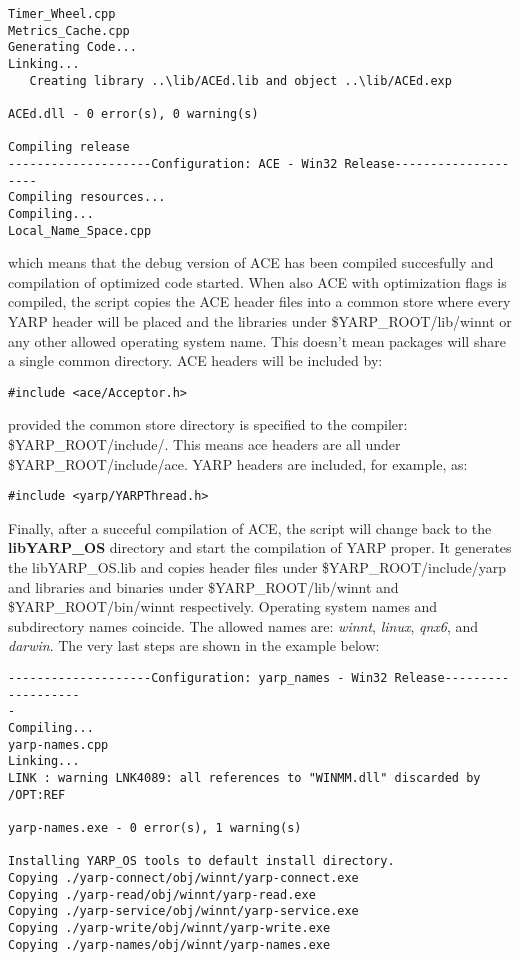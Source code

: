 \begin{verbatim}
Timer_Wheel.cpp
Metrics_Cache.cpp
Generating Code...
Linking...
   Creating library ..\lib/ACEd.lib and object ..\lib/ACEd.exp

ACEd.dll - 0 error(s), 0 warning(s)

Compiling release
--------------------Configuration: ACE - Win32 Release--------------------
Compiling resources...
Compiling...
Local_Name_Space.cpp

\end{verbatim}

which means that the debug version of ACE has been compiled succesfully and compilation of optimized code started. When also ACE with optimization flags is compiled, the script copies the ACE header files into a common store where every YARP header will be placed and the libraries under \$YARP\_ROOT/lib/winnt or any other allowed operating system name. This doesn't mean packages will share a single common directory. ACE headers will be included by:

\begin{verbatim}
#include <ace/Acceptor.h>
\end{verbatim}

provided the common store directory is specified to the compiler: \$YARP\_ROOT/include/. This means ace headers are all under \$YARP\_ROOT/include/ace. YARP headers are included, for example, as:

\begin{verbatim}
#include <yarp/YARPThread.h>
\end{verbatim}

Finally, after a succeful compilation of ACE, the script will change back to the {\bf libYARP\_OS} directory and start the compilation of YARP proper. It generates the libYARP\_OS.lib and copies header files under \$YARP\_ROOT/include/yarp and libraries and binaries under \$YARP\_ROOT/lib/winnt and \$YARP\_ROOT/bin/winnt respectively. Operating system names and subdirectory names coincide. The allowed names are: {\em winnt}, {\em linux}, {\em qnx6}, and {\em darwin}. The very last steps are shown in the example below:

\begin{verbatim}
--------------------Configuration: yarp_names - Win32 Release-------------------
-
Compiling...
yarp-names.cpp
Linking...
LINK : warning LNK4089: all references to "WINMM.dll" discarded by /OPT:REF

yarp-names.exe - 0 error(s), 1 warning(s)

Installing YARP_OS tools to default install directory.
Copying ./yarp-connect/obj/winnt/yarp-connect.exe
Copying ./yarp-read/obj/winnt/yarp-read.exe
Copying ./yarp-service/obj/winnt/yarp-service.exe
Copying ./yarp-write/obj/winnt/yarp-write.exe
Copying ./yarp-names/obj/winnt/yarp-names.exe

\end{verbatim}

